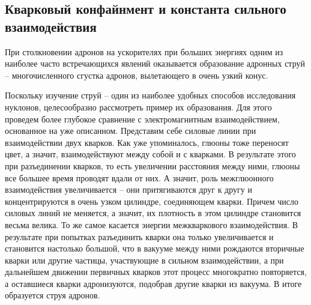 \documentclass[12pt, a4paper]{article}
\begin{document}




\subsection{Кварковый конфайнмент и константа сильного взаимодействия}


При столкновении адронов на ускорителях при больших энергиях одним из наиболее часто встречающихся явлений оказывается образование адронных струй -- многочисленного сгустка адронов, вылетающего в очень узкий конус. 

Поскольку изучение струй -- один из наиболее удобных способов исследования нуклонов, целесообразно рассмотреть пример их образования. Для этого проведем более глубокое сравнение с электромагнитным взаимодействием, основанное на уже описанном. Представим себе силовые линии при взаимодействии двух кварков. Как уже упоминалось, глюоны тоже переносят цвет, а значит, взаимодействуют между собой и с кварками. В результате этого при разъединении кварков, то есть увеличении расстояния между ними, глюоны все большее время проводят вдали от них. А значит, роль межглюонного взаимодействия увеличивается -- они притягиваются друг к другу и концентрируются в очень узком цилиндре, соединяющем кварки. Причем число силовых линий не меняется, а значит, их плотность в этом цилиндре становится весьма велика. То же самое касается энергии межкваркового взаимодействия. В результате при попытках разъединить кварки она только увеличивается и становится настолько большой, что в вакууме между ними рождаются вторичные кварки или другие частицы, участвующие в сильном взаимодействии, а при дальнейшем движении первичных кварков этот процесс многократно повторяется, а оставшиеся кварки адронизуются, подобрав другие кварки из вакуума. В итоге образуется струя адронов.
\end{document}
